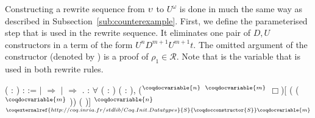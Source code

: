 Constructing a rewrite sequence from $\upsilon$ to $U^\omega$ is done in
much the same way as described in
Subsection~\ref{sub:counterexample}. First, we define the parameterised
step that is used in the rewrite sequence. It eliminates one pair of $D,
U$ constructors in a term of the form $U^n D^{m+1} U^{m+1} t$. The
omitted argument of the 
constructor (denoted by \coqdoclemma{\_}) is a proof of $\rho_1 \in
\mathcal{R}$. Note that  is the variable that is
used in both rewrite rules.
\begin{singlespace}
\begin{coqdoccode}
\coqdocnoindent
{}
 ( :
) :
 :=\coqdoceol
\coqdocindent{1.00em}
    \coqdoceol
\coqdocindent{1.00em}
\ensuremath{|}  \ensuremath{\Rightarrow}
\coqdoceol
\coqdocindent{1.00em}
\ensuremath{|}  \ensuremath{\Rightarrow}
\coqdoceol
\coqdocindent{1.00em}
.\coqdoceol
\coqdocemptyline
\coqdocnoindent
{}
:
\ensuremath{\forall} (  :
)
( :
),\coqdoceol
\coqdocindent{1.00em}
($^\coqdocvariable{n}$
$^\coqdocvariable{m}$
$\Box$)[
  (
($^\coqdocvariable{m}$
    )) (
)] 
$^\coqdocvariable{n}$
$^{\coqexternalref{http://coq.inria.fr/stdlib/Coq.Init.Datatypes}{S}{\coqdocconstructor{S}} \coqdocvariable{m}}$

\end{coqdoccode}
\end{singlespace}

